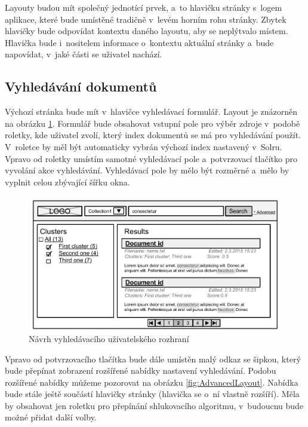 Layouty budou mít společný jednotící prvek, a~to hlavičku stránky s~logem aplikace, které bude umístěné tradičně v~levém horním rohu stránky. Zbytek hlavičky bude odpovídat kontextu daného layoutu, aby se neplýtvalo místem. Hlavička bude i~nositelem informace o~kontextu aktuální stránky a~bude napovídat, v~jaké části se uživatel nachází.

\subsection{Vyhledávání dokumentů}
Výchozí stránka bude mít v~hlavičce vyhledávací formulář. Layout je znázorněn na obrázku \ref{fig:SearchLayout}. Formulář bude obsahovat vstupní pole pro výběr zdroje v~podobě roletky, kde uživatel zvolí, který index dokumentů se má pro vyhledávání použít. V~roletce by měl být automaticky vybrán výchozí index nastavený v~Solru. Vpravo od roletky umístím samotné vyhledávací pole a~potvrzovací tlačítko pro vyvolání akce vyhledávání. Vyhledávací pole by mělo být rozměrné a~mělo by vyplnit celou zbývající šířku okna.

\begin{figure}[h]
\begin{center}
\includegraphics[width=13cm]{SearchLayout}
\caption{Návrh vyhledávacího uživatelského rozhraní}
\label{fig:SearchLayout}
\end{center}
\end{figure}

Vpravo od potvrzovacího tlačítka bude dále umístěn malý odkaz se šipkou, který bude přepínat zobrazení rozšířené nabídky nastavení vyhledávání. Podobu rozšířené nabídky můžeme pozorovat na obrázku \ref{fig:AdvancedLayout}. Nabídka bude stále ještě součástí hlavičky stránky (hlavička se o~ní vlastně rozšíří). Měla by obsahovat jen roletku pro přepínání shlukovacího algoritmu, v~budoucnu bude možné přidat další volby.

